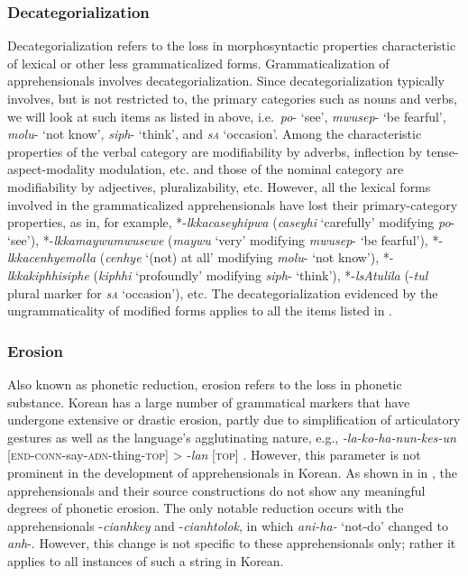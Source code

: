 \documentclass[output=paper,colorlinks,citecolor=brown]{langscibook}
\begin{document}
\subsubsection{Decategorialization}
\label{subsubsec:decategorialization}

Decategorialization refers to the loss in morphosyntactic properties characteristic of lexical or other less grammaticalized forms. Grammaticalization of apprehensionals involves decategorialization. Since decategorialization typically involves, but is not restricted to, the primary categories such as nouns and verbs, we will look at such items as listed in  above, i.e.\  \textit{po}- `see', \textit{mwusep}- `be fearful', \textit{molu}- `not know', \textit{siph}- `think', and \textit{s\textsc{a}} `occasion'. Among the characteristic properties of the verbal category are modifiability by adverbs, inflection by tense-aspect-modality modulation, etc. and those of the nominal category are modifiability by adjectives, pluralizability, etc. However, all the lexical forms involved in the grammaticalized apprehensionals have lost their primary-category properties, as in, for example, *-\textit{lkkacaseyhipwa} (\textit{caseyhi} `carefully' modifying \textit{po}- `see'), *-\textit{lkkamaywumwusewe} (\textit{maywu} `very' modifying \textit{mwusep}- `be fearful'),  *-\textit{lkkacenhyemolla} (\textit{cenhye} `(not) at all' modifying \textit{molu}- `not know'), *-\textit{lkkakiphhisiphe} (\textit{kiphhi} `profoundly' modifying \textit{siph}- `think'), *-\textit{lsAtulila} (-\textit{tul} plural marker for \textit{s\textsc{a}} `occasion'), etc. The decategorialization evidenced by the ungrammaticality of modified forms applies to all the items listed in .



\subsubsection{Erosion}
\label{subsubsec:erosion}

Also known as phonetic reduction, erosion refers to the loss in phonetic substance. Korean has a large number of grammatical markers that have undergone extensive or drastic erosion, partly due to simplification of articulatory gestures as well as the language's agglutinating nature, e.g., \textit{-la-ko-ha-nun-kes-un} [\textsc{end-conn}-say-\textsc{adn}-thing-\textsc{top}] > \nobreakdash-\textit{lan} [\textsc{top}] \citep[764]{Rhee2011}. However, this parameter is not prominent in the development of apprehensionals in Korean. As shown in  in , the apprehensionals and their source constructions do not show any meaningful degrees of phonetic erosion. The only notable reduction occurs with the apprehensionals \nobreakdash-\textit{cianhkey} and \nobreakdash-\textit{cianhtolok}, in which \textit{ani-ha-} `not-do' changed to \textit{anh}-. However, this change is not specific to these apprehensionals only; rather it applies to all instances of such a string in Korean. 
\end{document}
